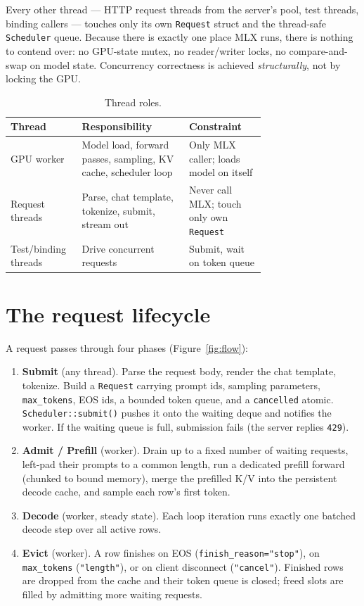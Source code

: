 \documentclass[11pt,a4paper]{report}
\newcommand{\code}[1]{\texttt{#1}}
\begin{document}
Every other thread --- HTTP request threads from the server's pool, test threads,
binding callers --- touches only its own \code{Request} struct and the thread-safe
\code{Scheduler} queue. Because there is exactly one place MLX runs, there is
nothing to contend over: no GPU-state mutex, no reader/writer locks, no
compare-and-swap on model state. Concurrency correctness is achieved
\emph{structurally}, not by locking the GPU.

\begin{table}[h]
\centering
\caption{Thread roles.}
\label{tab:threads}
\small
\begin{tabular}{@{}l p{0.42\linewidth} p{0.30\linewidth}@{}}
\toprule
Thread & Responsibility & Constraint \\
\midrule
GPU worker        & Model load, forward passes, sampling, KV cache, scheduler loop
                  & Only MLX caller; loads model on itself \\
Request threads   & Parse, chat template, tokenize, submit, stream out
                  & Never call MLX; touch only own \code{Request} \\
Test/binding threads & Drive concurrent requests
                  & Submit, wait on token queue \\
\bottomrule
\end{tabular}
\end{table}

\section{The request lifecycle}
A request passes through four phases (Figure~\ref{fig:flow}):

\begin{enumerate}[nosep]
  \item \textbf{Submit} (any thread). Parse the request body, render the chat
        template, tokenize. Build a \code{Request} carrying prompt ids, sampling
        parameters, \code{max\_tokens}, EOS ids, a bounded token queue, and a
        \code{cancelled} atomic. \code{Scheduler::submit()} pushes it onto the
        waiting deque and notifies the worker. If the waiting queue is full,
        submission fails (the server replies \code{429}).
  \item \textbf{Admit / Prefill} (worker). Drain up to a fixed number of waiting
        requests, left-pad their prompts to a common length, run a dedicated
        prefill forward (chunked to bound memory), merge the prefilled K/V into the
        persistent decode cache, and sample each row's first token.
  \item \textbf{Decode} (worker, steady state). Each loop iteration runs exactly
        one batched decode step over all active rows.
  \item \textbf{Evict} (worker). A row finishes on EOS
        (\code{finish\_reason="stop"}), on \code{max\_tokens}
        (\code{"length"}), or on client disconnect (\code{"cancel"}). Finished
        rows are dropped from the cache and their token queue is closed; freed
        slots are filled by admitting more waiting requests.
\end{enumerate}
\end{document}
